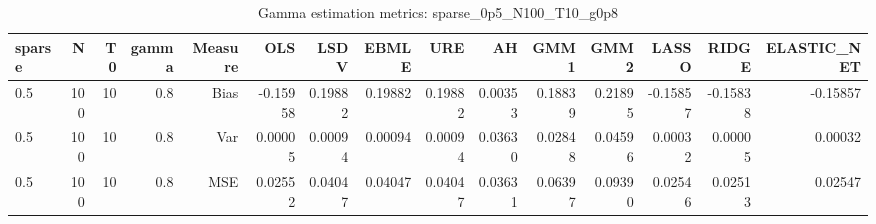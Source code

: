 \begin{table}[!htbp]\centering
\caption{Gamma estimation metrics: sparse_0p5_N100_T10_g0p8}
\label{tab:table1_sparse_0p5_N100_T10_g0p8}
\begin{tabular}{lrrrrrrrrrrrrrr}
\hline
sparse & N & T0 & gamma & Measure & OLS & LSDV & EBMLE & URE & AH & GMM1 & GMM2 & LASSO & RIDGE & ELASTIC_NET \\
\hline
0.5 & 100 & 10 & 0.8 & Bias & -0.15958 & 0.19882 & 0.19882 & 0.19882 & 0.00353 & 0.18839 & 0.21895 & -0.15857 & -0.15838 & -0.15857 \\
0.5 & 100 & 10 & 0.8 & Var & 0.00005 & 0.00094 & 0.00094 & 0.00094 & 0.03630 & 0.02848 & 0.04596 & 0.00032 & 0.00005 & 0.00032 \\
0.5 & 100 & 10 & 0.8 & MSE & 0.02552 & 0.04047 & 0.04047 & 0.04047 & 0.03631 & 0.06397 & 0.09390 & 0.02546 & 0.02513 & 0.02547 \\
\hline
\end{tabular}
\end{table}

